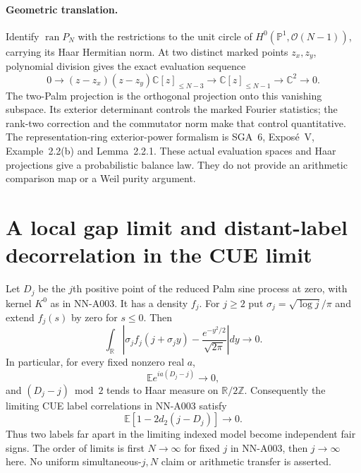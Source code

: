 \paragraph{Geometric translation.}
Identify $\operatorname{ran}P_N$ with the restrictions to the unit
circle of $H^0(\mathbb P^1,\mathcal O(N-1))$, carrying its Haar
Hermitian norm. At two distinct marked points $z_x,z_y$, polynomial
division gives the exact evaluation sequence
\[
 0\longrightarrow (z-z_x)(z-z_y)\mathbb C[z]_{\le N-3}
 \longrightarrow\mathbb C[z]_{\le N-1}
 \longrightarrow\mathbb C^2\longrightarrow0.
\]
The two-Palm projection is the orthogonal projection onto this
vanishing subspace. Its exterior determinant controls the marked
Fourier statistics; the rank-two correction and the commutator
norm make that control quantitative. The representation-ring
exterior-power formalism is SGA~6, Expos\'e~V, Example~2.2(b) and
Lemma~2.2.1. These actual evaluation spaces and Haar projections
give a probabilistic balance law. They do not provide an
arithmetic comparison map or a Weil purity argument.


\section{A local gap limit and distant-label decorrelation in the CUE limit}

\begin{theorem}
Let $D_j$ be the $j$th positive point of the reduced Palm sine process
at zero, with kernel $K^0$ as in NN-A003. It has a density $f_j$.
For $j\ge2$ put $\sigma_j=\sqrt{\log j}/\pi$ and extend $f_j(s)$
by zero for $s\le0$. Then
\[
 \int_{\mathbb R}\left|
 \sigma_j f_j(j+\sigma_j y)
       -\frac{e^{-y^2/2}}{\sqrt{2\pi}}\right|dy\longrightarrow0.
                                                        \tag{A016.1}
\]
In particular, for every fixed nonzero real $a$,
\[
 \mathbb E e^{ia(D_j-j)}\longrightarrow0,               \tag{A016.2}
\]
and $(D_j-j)\bmod2$ tends to Haar measure on $\mathbb R/2\mathbb Z$.
Consequently the limiting CUE label correlations in NN-A003 satisfy
\[
 \mathbb E[1-2d_2(j-D_j)]\longrightarrow0.
\]
Thus two labels far apart in the limiting indexed model become
independent fair signs. The order of limits is first $N\to\infty$
for fixed $j$ in NN-A003, then $j\to\infty$ here. No uniform
simultaneous-$j,N$ claim or arithmetic transfer is asserted.
\end{theorem}

